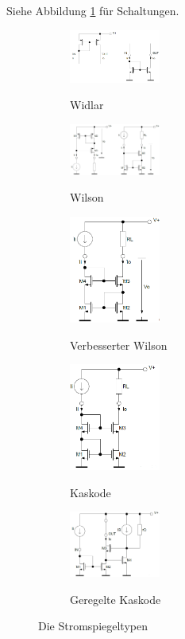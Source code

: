 Siehe Abbildung \ref{fig:stromspiegeltypen} für Schaltungen.


\begin{figure}[h]
	\centering
	\begin{subfigure}[b]{3cm}
		\centering
		{\includegraphics[width=3cm]{images/stromspiegel/widlar.png}}
		\caption{Widlar}
	\end{subfigure} \qquad	
	\begin{subfigure}[b]{3cm}
		\centering
		{\includegraphics[width=3cm]{images/stromspiegel/wilson.png}}
		\caption{Wilson}
	\end{subfigure} \qquad	
	\begin{subfigure}[b]{3cm}
		\centering
		{\includegraphics[width=3cm]{images/stromspiegel/verbesserter_wilson.png}}
		\caption{Verbesserter Wilson}
	\end{subfigure} \qquad	
	\begin{subfigure}[b]{3cm}
		\centering
		{\includegraphics[width=3cm]{images/stromspiegel/kaskode.png}}
		\caption{Kaskode}
	\end{subfigure} \qquad	
	\begin{subfigure}[b]{3cm}
		\centering
		{\includegraphics[width=3cm]{images/stromspiegel/geregelte_kaskode.png}}
		\caption{Geregelte Kaskode}
	\end{subfigure}
	\caption{Die Stromspiegeltypen}
	\label{fig:stromspiegeltypen}
\end{figure}